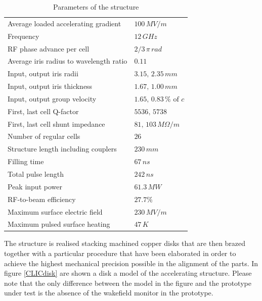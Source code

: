 \begin{table}[h]
  \centering
    \begin{tabular}{ l l  }
    \hline
    \hline
    Average loaded accelerating gradient			& $100\, MV/m$	\\
    Frequency								& $12 \, GHz$	\\        
    RF phase advance per cell					& $2/3 \, \pi \, rad$	\\       
    Average iris radius to wavelength ratio			& $0.11$	\\ 
    Input, output iris radii      					& $3.15, \, 2.35 \, mm$	\\
    Input, output iris thickness      				& $1.67, \, 1.00 \, mm$	\\
    Input, output group velocity					& $1.65, \, 0.83 \, \% \text{ of }c $	\\
    First, last cell Q-factor						& $5536,\,5738$\\
    First, last cell shunt impedance				& $81,\,103\, M\Omega / m$\\
    Number of regular cells						& $26$	\\   
    Structure length including couplers			& $230 \,mm$	\\   
    Filling time								& $67 \, ns$	\\               
    Total pulse length							& $242 \, ns$	\\      
    Peak input power 							& $61.3 \, MW$	\\        
    RF-to-beam efficiency						& $27.7 \%$	\\   
    Maximum surface electric field				& $230 \, MV/m$	\\           
    Maximum pulsed surface heating				& $47 \, K$	\\       
    \hline
    \hline
    \end{tabular}
  \caption{Parameters of the structure}
\label{TD26_param_1}
\end{table}

The structure is realised stacking machined copper disks that are then brazed together with a particular procedure that have been elaborated in order to achieve the highest mechanical precision possible in the alignment of the parts. In figure \ref{CLICdisk} are shown a disk a model of the accelerating structure. Please note that the only difference between the model in the figure and the prototype under test is the absence of the wakefield monitor in the prototype. 

